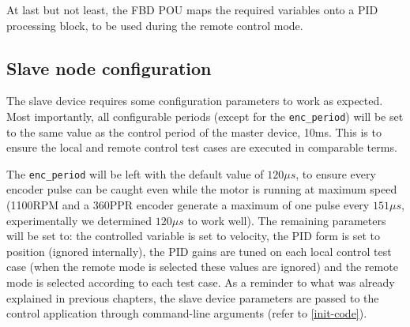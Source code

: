 At last but not least, the FBD POU maps the required variables onto a PID processing block, to be used during the remote control mode.

\subsection{Slave node configuration}
The slave device requires some configuration parameters to work as expected.
Most importantly, all configurable periods (except for the \verb|enc_period|) will be set to the same value as the control period of the master device, 10ms.
This is to ensure the local and remote control test cases are executed in comparable terms.

The \verb|enc_period| will be left with the default value of $120\mu s$, to ensure every encoder pulse can be caught even while the motor is running at maximum speed (1100RPM and a 360PPR encoder generate a maximum of one pulse every $151\mu s$, experimentally we determined $120\mu s$ to work well).
The remaining parameters will be set to: the controlled variable is set to velocity, the PID form is set to position (ignored internally), the PID gains are tuned on each local control test case (when the remote mode is selected these values are ignored) and the remote mode is selected according to each test case.
As a reminder to what was already explained in previous chapters, the slave device parameters are passed to the control application through command-line arguments (refer to \autoref{init-code}).
